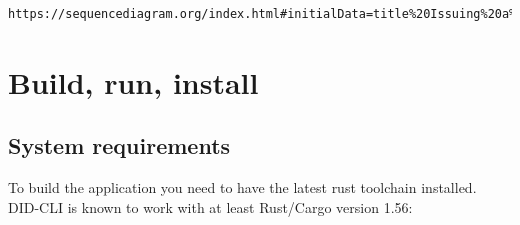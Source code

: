 \begin{lstlisting}[language=bash]
https://sequencediagram.org/index.html#initialData=title%20Issuing%20a%20VC%20to%20Bob%0A%0A%0Aparticipant%20Bob%20DID-CLI%0Aactor%20Bob%0A%0Aparticipant%20File%0A%0Aactor%20Alice%0Aparticipant%20Alice%20DID-CLI%0Aparticipant%20ed25519_dalek%0Aparticipant%20did_key%0Aparticipant%20ssi%0Aparticipant%20didcomm_rs%0A%0Aentryspacing%200.9%0ABob-%3EBob%20DID-CLI%3A%20did%20init%0ABob%3C%3C--Bob%20DID-CLI%3A%20(did)%0AFile%3C-Bob%3A%20Write(did)%0AAlice-%3EFile%3A%20Read(did)%0AAlice%3C%3C--File%3A%20(Bobs%20did)%0AAlice-%3EAlice%20DID-CLI%3A%20did%20init%0AAlice%20DID-CLI-%3Eed25519_dalek%3A%20Create%20private%20jwk%0AAlice%20DID-CLI%3C%3C--ed25519_dalek%3A%20(Private%20jwk)%0AAlice%3C%3C--Alice%20DID-CLI%3A%20(Alices%20did)%0AAlice-%3EAlice%20DID-CLI%3A%20Issue(Passport%20to%20Bobs%20did)%0AAlice%20DID-CLI-%3Edid_key%3A%20Init%20Alice%20DID(Alice%20private%20jwk)%0AAlice%20DID-CLI%3C%3C--did_key%3A%20(Alice%20DID)%0AAlice%20DID-CLI-%3Edid_key%3A%20Init%20Bob%20DID(Bobs%20did)%0AAlice%20DID-CLI%3C%3C--did_key%3A%20(Bob%20DID)%0A%0A%0AAlice%20DID-CLI-%3Essi%3A%20Issue%20Verifiable%20Credential%20(from%3A%20Alice%20DID%2C%20to%3A%20Bob%20DID)%0AAlice%20DID-CLI%3C%3C--ssi%3A%20(Signed%20verifiable%20credential)%0A%0AAlice%20DID-CLI-%3Edidcomm_rs%3A%20Create%20DIDComm-message(from%3A%20Alice%20DID%2C%20to%3A%20Bob%20DID%2C%20message%3A%20VC)%20%20%0A%0AAlice%20DID-CLI%3C%3C--didcomm_rs%3A%20(dcem)%0AAlice%3C%3C--Alice%20DID-CLI%3A%20(dcem)%0A%0AAlice-%3E%3EFile%3A%20Write%20(dcem)%0AFile%3C-Bob%3A%20Read(dcem)%0AFile--%3E%3EBob%3A%20(dcem)%0ABob-%3EBob%20DID-CLI%3A%20Hold(dcem)%0ABob%3C%3C--Bob%20DID-CLI%3A%20(dcem)%0ABob-%3EBob%20DID-CLI%3A%20Read(dcem)%0ABob%3C%3C--Bob%20DID-CLI%3A%20(vc%20Passport)%0A
\end{lstlisting}

\hypertarget{build-run-install}{%
\section{Build, run, install}\label{build-run-install}}

\hypertarget{system-requirements}{%
\subsection{System requirements}\label{system-requirements}}

To build the application you need to have the latest rust toolchain
installed. DID-CLI is known to work with at least Rust/Cargo version
1.56:

